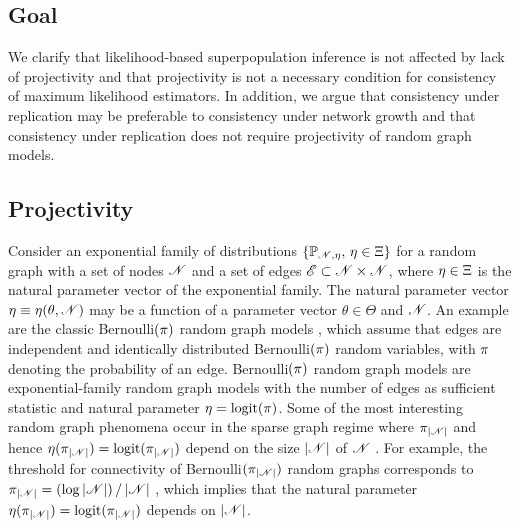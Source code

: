 \documentclass[12pt]{article}
\begin{document}
\subsection{Goal} 

We clarify that likelihood-based superpopulation inference is not affected by lack of projectivity and that projectivity is not a necessary condition for consistency of maximum likelihood estimators.
In addition,
we argue that consistency under replication may be preferable to consistency under network growth and that consistency under replication does not require projectivity of random graph models.

\subsection{Projectivity}
\label{intro1}

Consider an exponential family of distributions $\{\mathbb{P}_{\mathscr{N},\eta},\, \eta\in\Xi\}$ for a random graph with a set of nodes $\mathscr{N}$ and a set of edges $\mathscr{E} \subset \mathscr{N} \times \mathscr{N}$,
where $\eta \in \Xi$ is the natural parameter vector of the exponential family.
The natural parameter vector $\eta \equiv \eta(\theta, \mathscr{N})$ may be a function of a parameter vector $\theta \in \Theta$ and $\mathscr{N}$.
An example are the classic Bernoulli$(\pi)$ random graph models \citep{ErRe60},
which assume that edges are independent and identically distributed Bernoulli$(\pi)$ random variables, 
with $\pi$ denoting the probability of an edge.
Bernoulli$(\pi)$ random graph models are exponential-family random graph models with the number of edges as sufficient statistic and natural parameter $\eta = \operatorname{logit}(\pi)$.
Some of the most interesting random graph phenomena occur in the sparse graph regime where $\pi_{|\mathscr{N}|}$ and hence $\eta(\pi_{|\mathscr{N}|}) = \operatorname{logit}(\pi_{|\mathscr{N}|})$ depend on the size $|\mathscr{N}|$ of $\mathscr{N}$ \citep{ErRe60}.
For example,
the threshold for connectivity of Bernoulli$(\pi_{|\mathscr{N}|})$ random graphs corresponds to $\pi_{|\mathscr{N}|} = (\log |\mathscr{N}|)\, /\, |\mathscr{N}|$ \citep{ErRe60},
which implies that the natural parameter $\eta(\pi_{|\mathscr{N}|}) = \operatorname{logit}(\pi_{|\mathscr{N}|})$ depends on $|\mathscr{N}|$.
\end{document}

